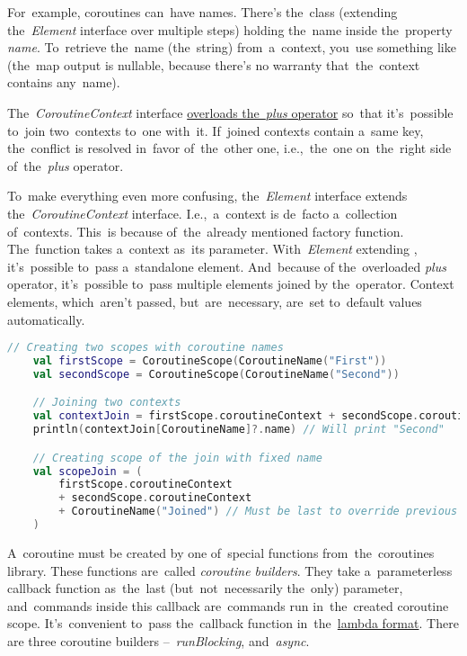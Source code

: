 For~example, coroutines can~have names.
There's the~class  (extending \mbox{the~\textit{Element}} interface over multiple steps) holding the~name inside the~property \mbox{\textit{name}.}
To~retrieve the~name (the~string) from~a~context, you~use something like  (the~map output is nullable, because there's no warranty that~the~context contains any~name).

\mbox{The~\textit{CoroutineContext}} interface \hyperref[kotlinoperatoroverload]{overloads the~\textit{plus} operator} so~that it's~possible to~join two~contexts to~one with~it.
If~joined contexts contain a~same key, the~conflict is resolved in~favor of~the~other one, i.e.,~the~one on~the~right side of~the~\textit{plus} operator.

To~make everything even more confusing, \mbox{the~\textit{Element}} interface extends \mbox{the \textit{CoroutineContext}} interface.
I.e.,~a~context is de~facto a~collection of~contexts.
This~is because of~the~already mentioned \hyperref[kotlincoroutinescope]{} factory function.
The~function takes a~context as~its parameter.
\mbox{With \textit{Element}} extending , it's~possible to~pass a~standalone element.
And~because of the~overloaded \textit{plus} operator, it's~possible to~pass multiple elements joined by the~operator.
Context elements, which~aren't passed, but~are~necessary, are~set to~default values automatically.

\begin{lstlisting}[language=Kotlin]
    // Creating two scopes with coroutine names
    val firstScope = CoroutineScope(CoroutineName("First"))
    val secondScope = CoroutineScope(CoroutineName("Second"))

    // Joining two contexts
    val contextJoin = firstScope.coroutineContext + secondScope.coroutineContext
    println(contextJoin[CoroutineName]?.name) // Will print "Second"

    // Creating scope of the join with fixed name
    val scopeJoin = (
        firstScope.coroutineContext
        + secondScope.coroutineContext
        + CoroutineName("Joined") // Must be last to override previous
    )
\end{lstlisting}

\label{kotlincoroutinebuilder}
A~coroutine must be created by one of~special functions from~the~coroutines library.
These functions are~called \textit{coroutine builders}.
They take a~parameterless callback function as~the~last (but~not~necessarily the~only) parameter, and~commands inside this callback are~commands run in~the~created coroutine scope.
It's~convenient to~pass the~callback function in~the~\hyperref[kotlinlambda]{lambda format}.
There are three coroutine builders --~\mbox{\textit{runBlocking},}  \mbox{and \textit{async}}.

